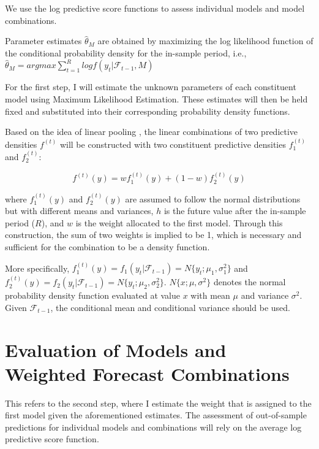 \documentclass{monashthesis}
\begin{document}
We use the log predictive score functions to assess individual models and model combinations.

Parameter estimates \(\hat\theta_M\) are obtained by maximizing the log likelihood function of the conditional probability density for the in-sample period, i.e., \(\hat\theta_M = argmax \sum^R_{t=1} log f(y_t|\mathcal{F}_{t-1}, M)\)

For the first step, I will estimate the unknown parameters of each constituent model using Maximum Likelihood Estimation. These estimates will then be held fixed and substituted into their corresponding probability density functions.

Based on the idea of linear pooling \autocite{BG69,HM07,GA11}, the linear combinations of two predictive densities \(f^{(t)}\) will be constructed with two constituent predictive densities \(f^{(t)}_1\) and \(f^{(t)}_2\):

\begin{equation}
f^{(t)}(y) = wf^{(t)}_1(y) + (1-w)f^{(t)}_2(y)
\end{equation}

where \(f^{(t)}_1(y)\) and \(f^{(t)}_2(y)\) are assumed to follow the normal distributions but with different means and variances, \(h\) is the future value after the in-sample period (\(R\)), and \(w\) is the weight allocated to the first model. Through this construction, the sum of two weights is implied to be 1, which is necessary and sufficient for the combination to be a density function\autocite{GA11}.

More specifically, \(f^{(t)}_1(y)=f_1(y_t|\mathcal{F}_{t-1})=N\{y_t; \mu_1, \sigma^2_1\}\) and \(f^{(t)}_2(y)=f_2(y_t|\mathcal{F}_{t-1})=N\{y_t; \mu_2, \sigma^2_2\}\). \(N\{x; \mu, \sigma^2\}\) denotes the normal probability density function evaluated at value \(x\) with mean \(\mu\) and variance \(\sigma^2\). Given \(\mathcal{F}_{t-1}\), the conditional mean and conditional variance should be used.

\hypertarget{evaluation}{%
\section{Evaluation of Models and Weighted Forecast Combinations}\label{evaluation}}

This refers to the second step, where I estimate the weight that is assigned to the first model given the aforementioned estimates. The assessment of out-of-sample predictions for individual models and combinations will rely on the average log predictive score function.
\end{document}
